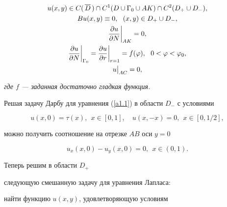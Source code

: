 \begin{gather}


u(x,y)\in {C}(\,\overline D\,)\cap


{C}^1(D\cup\Gamma_0\cup AK)\cap 


{C}^2(D_+\cup D_-),\label{a1.2} \\


%


Bu(x,y)\equiv 0,\ \ (x,y)\in D_+\cup D_-,\label{a1.3} \\


%


\frac{\partial u}{\partial N}\bigg|_{AK}=0,\label{a11.4} \\


%


\frac{\partial u}{\partial N}\bigg|_{\Gamma_0}=\frac{\partial u}{\partial r}


\bigg|_{r=1}=f(\varphi),\ \ 0<\varphi <\varphi_0,\label{a1.4} \\


%


u\big|_{AC}=0,\notag


\end{gather}


{\it где $f$ --- заданная достаточно гладкая функция.}


\medskip





Решая задачу Дарбу для уравнения (\ref{a1.1}) в области $D_-$ с условиями


\begin{equation}


u(x,0)=\tau(x),\ \ x\in[0,1],\quad u(x,-x)=0,\ \ x\in[0,1/2],\label{a11.5}


\end{equation}


можно получить соотношение на отрезке $AB$ оси $y=0$


\begin{equation}


u_x(x,0)-u_y(x,0)=0,\ \ x\in (0,1).\label{a1.5}


\end{equation}





Теперь решим в области $D_+$ 


следующую смешанную задачу для уравнения Лапласа:


найти функцию $u(x,y)$, удовлетворяющую условиям


